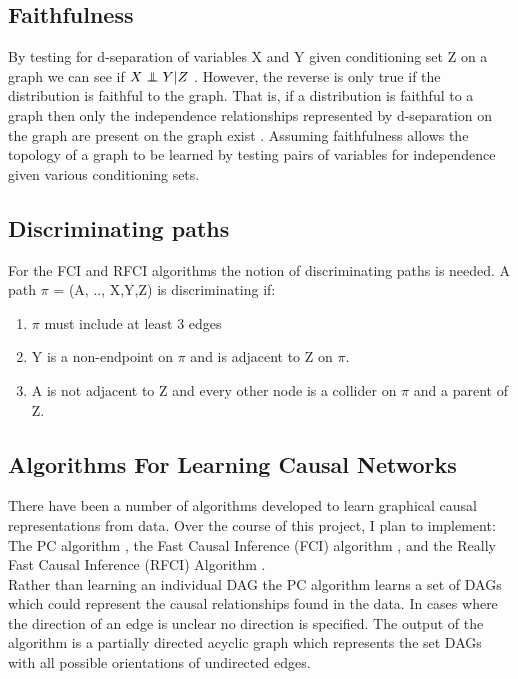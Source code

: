 \documentclass{article}
\newcommand\independent{\protect\mathpalette{\protect\independenT}{\perp}}
\def\independenT#1#2{\mathrel{\rlap{$#1#2$}\mkern2mu{#1#2}}}
\begin{document}
\subsection{Faithfulness}


By testing for d-separation of variables X and Y given conditioning set Z on a graph we can see if $X \independent Y | Z$ \cite{pearl2009}. However, the reverse is only true if the distribution is faithful to the graph. That is, if a distribution is faithful to a graph then only the independence relationships represented by d-separation on the graph are present on the graph exist \cite{scheines1997introduction}. Assuming faithfulness allows the topology of a graph to be learned by testing pairs of variables for independence given various conditioning sets.
\\

\subsection{Discriminating paths}
For the FCI and RFCI algorithms the notion of discriminating paths is needed. A path $\pi$ = (A, .., X,Y,Z) is discriminating if:
\\

\begin{enumerate}
\item $\pi$ must include at least 3 edges
\item Y is a non-endpoint on $\pi$ and is adjacent to Z on $\pi$.
\item A is not adjacent to Z and every other node is a collider on $\pi$ and a parent of Z. \cite{colombo2012learning} 
\end{enumerate}

\subsection{Algorithms For Learning Causal Networks}
 There have been a number of algorithms developed to learn graphical causal representations from data. Over the course of this project, I plan to implement: The PC algorithm \cite{spirtes1991algorithm}, the Fast Causal Inference (FCI) algorithm \cite{colombo2012learning}, and the Really Fast Causal Inference (RFCI) Algorithm \cite{colombo2012learning}.
\\

Rather than learning an individual DAG the PC algorithm learns a set of DAGs which could represent the causal relationships found in the data. In cases where the direction of an edge is unclear no direction is specified. The output of the algorithm is a partially directed acyclic graph which represents the set DAGs with all possible orientations of undirected edges\cite{spirtes1991algorithm}.
\\
\end{document}
